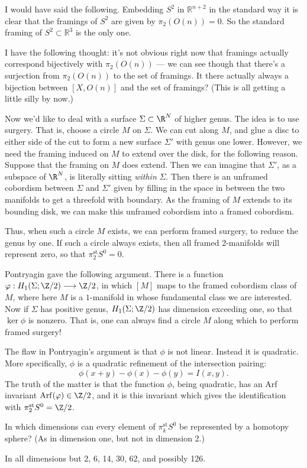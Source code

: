 \documentclass[11pt]{article}
\newcommand{\rednote}[1]{{\color{red}#1}\scalebox{.1}{rednote}}
\newcommand{\bluenote}[1]{{\color{blue}#1}\scalebox{.1}{rednote}}
\begin{document}
\bluenote{%
I would have said the following. Embedding $S^2$ in
$\mathbb{R}^{n+2}$ in the standard way it is clear that
the framings of $S^2$ are given by $\pi_2(O(n))=0$. So the standard framing
of $S^2\subset\mathbb{R}^3$ is the only one.}

\rednote{I have the following thought: it's not obvious right now that
framings actually correspond bijectively with $\pi_2(O(n))$ --- we can see
though that there's a surjection from $\pi_2(O(n))$ to the set of framings. It
there actually always a bijection between $[X,O(n)]$ and the set of framings?
(This is all getting a little silly by now.)}



Now we'd like to deal with a surface $\Sigma\subset\R^N$ of higher genus. The
idea is to use surgery. That is, choose a circle $M$ on $\Sigma$. We can cut
along $M$, and glue a disc to either side of the cut to form a new surface
$\Sigma'$ with genus one lower. However, we need the framing induced on $M$ to
extend over the disk, for the following reason. Suppose that the framing on $M$
does extend. Then we can imagine that $\Sigma'$, as a subspace of $\R^N$, is
literally sitting \emph{within} $\Sigma$. Then there is an unframed cobordism
between $\Sigma$ and $\Sigma'$ given by filling in the space in between the two
manifolds to get a threefold with boundary. As the framing of $M$ extends to its
bounding disk, we can make this unframed cobordism into a framed cobordism.

Thus, when such a circle $M$ exists, we can perform framed surgery, to reduce
the genus by one. If such a circle always exists, then all framed 2-manifolds
will represent zero, so that $\pi_2^\text{st}S^0=0$.

Pontryagin gave the following argument. There is a function
$\phi:H_1(\Sigma;\Z/2)\to\Z/2$, in which $[M]$ maps to the framed cobordism
class of $M$, where here $M$ is a $1$-manifold in whose fundamental class we are
interested. Now if $\Sigma$ has positive genus, $H_1(\Sigma;\Z/2)$ has dimension
exceeding one, so that $\ker\phi$ is nonzero. That is, one can always find a
circle $M$ along which to perform framed surgery!

The flaw in Pontryagin's argument is that $\phi$ is not linear. Instead it is
quadratic. More specifically, $\phi$ is a quadratic refinement of the
intersection pairing:
\[\phi(x+y)-\phi(x)-\phi(y)=I(x,y).\]
The truth of the matter is that the function $\phi$, being quadratic, has an Arf
invariant $\ArfInvariant(\phi)\in\Z/2$, and it is this invariant which gives the
identification with $\pi_2^\text{st}S^0=\Z/2$.
\begin{question}
In which dimensions can every element of $\pi_k^\text{st}S^0$ be represented by
a homotopy sphere? (As in dimension one, but not in dimension 2.)
\end{question}
\begin{answer}
In all dimensions but 2, 6, 14, 30, 62, and possibly 126.
\end{answer}
\end{document}
